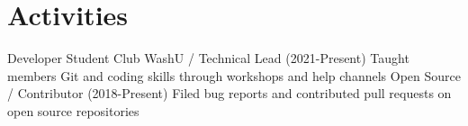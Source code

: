 \section{Activities}
\begin{outline}
\1 Developer Student Club WashU / Technical Lead (2021-Present)
    \2 Taught members Git and coding skills through workshops and help channels
\1 Open Source / Contributor (2018-Present)
    \2 Filed bug reports and contributed pull requests on open source repositories
\end{outline}
